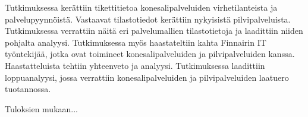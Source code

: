 Tutkimuksessa kerättiin tikettitietoa konesalipalveluiden virhetilanteista ja palvelupyynnöistä. Vastaavat tilastotiedot kerättiin nykyisistä pilvipalveluista. Tutkimuksessa verrattiin näitä eri palvelumallien tilastotietoja ja laadittiin niiden pohjalta analyysi. Tutkimuksessa myös haastateltiin kahta Finnairin IT työntekijää, jotka ovat toimineet konesalipalveluiden ja pilvipalveluiden kanssa. Haastatteluista tehtiin yhteenveto ja analyysi. Tutkimuksessa laadittiin loppuanalyysi, jossa verrattiin konesalipalveluiden ja pilvipalveluiden laatuero tuotannossa.

Tuloksien mukaan...
